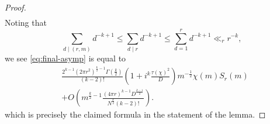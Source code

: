 \documentclass[10pt,a4paper]{amsart}
\begin{document}
\begin{proof}
\begin{align}
\end{align}
Noting that 
\begin{equation}
\sum_{d \mid (r,m)} d^{-k+1} \leq \sum_{d \mid r} d^{-k+1} \leq \sum_{d=1}^r d^{-k+1} \ll_r r^{-k},
\end{equation}
we see \eqref{eq:final-asymp} is equal to
\begin{align}\nonumber
&\frac{2^{k-1}(2\pi r^2)^{\frac{k}{2}-1}\Gamma\left(\frac{k}{2}\right)}{(k-2)!}\left(1+i^k\frac{\tau(\chi)^2}{D}\right)m^{-\frac{1}{2}}\chi(m) S_r(m)\\
&+O\left(m^{\frac{k}{2}-1}\frac{(4\pi r)^{k-1}D^{\frac{k-1}{2}}}{N^{\frac{k}{2}}(k-2)!}\right).
\end{align}
which is precisely the claimed formula in the statement of the lemma. 
\end{proof}
\end{document}
